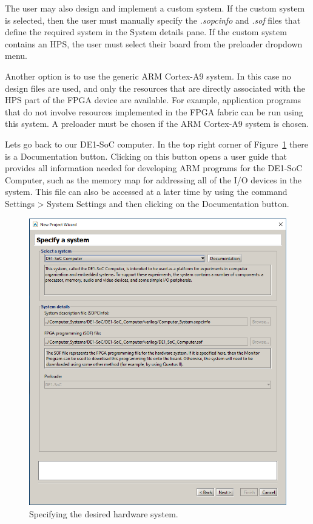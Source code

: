 \documentclass[11pt, twoside, pdftex]{article}
\begin{document}
\begin{enumerate}
The user may also design and implement a custom system.
If the custom system is selected, then the user must manually 
specify the \emph{.sopcinfo} and \emph{.sof} files that define
the required system in the {\sf System details} pane. If the custom system contains an HPS, the user must select their board from the preloader dropdown menu.

Another option is to use the generic ARM Cortex-A9 system. 
In this case no design files are used, and only the resources
that are directly associated with the HPS part of the FPGA device
are available. For example, application programs that do not
involve resources implemented in the FPGA fabric can be run using
this system. A preloader must be chosen if the ARM Cortex-A9 system
is chosen.

Lets go back to our DE1-SoC computer. In the top right corner of Figure~\ref{fig:6} there is a 
{\sf Documentation} button. Clicking on this button opens a user guide that provides all
information needed for developing ARM programs for the 
DE1-SoC Computer, such as the memory map for
addressing all of the I/O devices in the system. This file can also be accessed at a later time by
using the command {\sf Settings > System Settings} and then clicking on the {\sf Documentation}
button.

\begin{figure}[H]
   \begin{center}
      \includegraphics[scale=0.55]{screenshots/figure6.png}
   \end{center}
   \caption{Specifying the desired hardware system.}
	 \label{fig:6}
\end{figure}


\end{enumerate}
\end{document}
